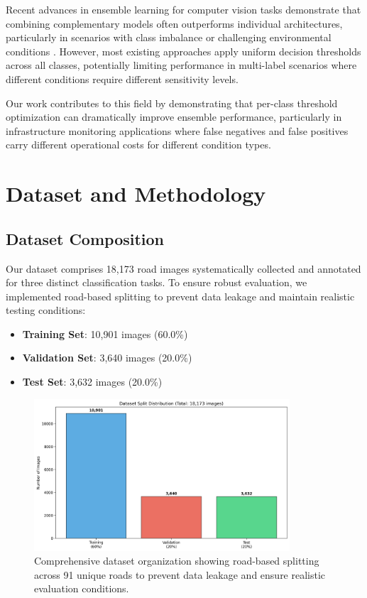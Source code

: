 \documentclass[12pt]{article}
\begin{document}
Recent advances in ensemble learning for computer vision tasks demonstrate that combining complementary models often outperforms individual architectures, particularly in scenarios with class imbalance or challenging environmental conditions \citet{bishop2006pattern}. However, most existing approaches apply uniform decision thresholds across all classes, potentially limiting performance in multi-label scenarios where different conditions require different sensitivity levels.

Our work contributes to this field by demonstrating that per-class threshold optimization can dramatically improve ensemble performance, particularly in infrastructure monitoring applications where false negatives and false positives carry different operational costs for different condition types.

\section{Dataset and Methodology}

\subsection{Dataset Composition}

Our dataset comprises 18,173 road images systematically collected and annotated for three distinct classification tasks. To ensure robust evaluation, we implemented road-based splitting to prevent data leakage and maintain realistic testing conditions:

\begin{itemize}[itemsep=1pt,parsep=0pt,topsep=3pt]
\item \textbf{Training Set}: 10,901 images (60.0\%)
\item \textbf{Validation Set}: 3,640 images (20.0\%)
\item \textbf{Test Set}: 3,632 images (20.0\%)
\end{itemize}

\begin{figure}[!htb]
\centering
\includegraphics[width=0.85\textwidth]{images/dataset_split.png}
\caption{Comprehensive dataset organization showing road-based splitting across 91 unique roads to prevent data leakage and ensure realistic evaluation conditions.}
\end{figure}
\end{document}
